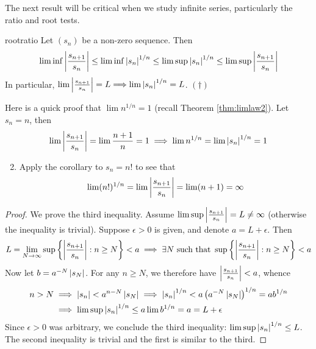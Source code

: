 The next result will be critical when we study infinite series, particularly the ratio and root tests.

\begin{thm}{}{rootratio}
	Let $(s_n)$ be a non-zero sequence. Then
	\[
		\liminf\left| \frac{s_{n+1}}{s_n}\right|
		\le\liminf\left| s_n\right|^{1/n}
		\le\limsup\left| s_n\right|^{1/n}
		\le\limsup\left| \frac{s_{n+1}}{s_n}\right|
	\]
	In particular, $\lim\left| \frac{s_{n+1}}{s_n}\right|=L\Longrightarrow \lim\left| s_n\right|^{1/n}=L$. \hfill$(\dag)$
\end{thm}


\begin{examples}{}{}
	\exstart Here is a quick proof that $\lim n^{1/n}=1$ (recall Theorem \ref{thm:limlaw2}). Let $s_n=n$, then
  \[
  	\lim\left| \frac{s_{n+1}}{s_n}\right|=\lim\frac{n+1}n=1\implies \lim n^{1/n}=\lim\left| s_n\right|^{1/n}=1
  \]
	\begin{enumerate}\setcounter{enumi}{1}
	  \item Apply the corollary to $s_n=n!$ to see that
	  \[
	  	\lim(n!)^{1/n} 
	  	=\lim\left| \frac{s_{n+1}}{s_n}\right| 
	  	=\lim(n+1)=\infty
	  \]
	\end{enumerate}
\end{examples}


\begin{proof}
	We prove the third inequality. Assume $\limsup\left| \frac{s_{n+1}}{s_n}\right|=L\neq \infty$ (otherwise the inequality is trivial). Suppose $\epsilon>0$ is given, and denote $a=L+\epsilon$. Then
	\[
		L=\lim_{N\to\infty} \sup\left\{\left| \frac{s_{n+1}}{s_n}\right|:n\ge N\right\}
		<a\implies
		\exists N\text{ such that }
		\sup\left\{\left| \frac{s_{n+1}}{s_n}\right|:n\ge N\right\}<a
	\]
	Now let $b=a^{-N}\left| s_{N}\right|$. For any $n\ge N$, we therefore have $\left| \frac{s_{n+1}}{s_n}\right|<a$, whence
	\begin{align*}
		n>N&\implies \left| s_n\right|< a^{n-N}\left| s_{N}\right| \implies \left| s_n\right|^{1/n}< a\left(a^{-N}\left| s_{N}\right|\right)^{1/n} =ab^{1/n}\\
		&\implies \limsup\left| s_n\right|^{1/n}\le a\lim b^{1/n}=a=L+\epsilon
	\end{align*}
	Since $\epsilon>0$ was arbitrary, we conclude the third inequality: $\limsup\left| s_n\right|^{1/n}\le L$.\smallbreak
	The second inequality is trivial and the first is similar to the third.
\end{proof}


